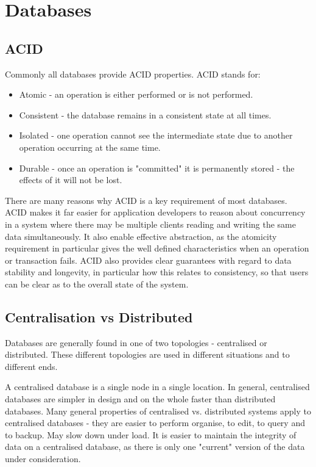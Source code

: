 \documentclass[12pt,twoside,notitlepage]{report}
\begin{document}
\section{Databases}

\subsection*{ACID}

Commonly all databases provide ACID properties. ACID stands for:

\begin{itemize}
\item Atomic - an operation is either performed or is not performed.
\item Consistent - the database remains in a consistent state at all times.
\item Isolated - one operation cannot see the intermediate state due to another operation occurring
	at the same time.
\item Durable - once an operation is "committed" it is permanently stored - the effects of it will
	not be lost.
\end{itemize}

There are many reasons why ACID is a key requirement of most databases. ACID makes it far easier
for application developers to reason about concurrency in a system where there may be multiple
clients reading and writing the same data simultaneously. It also enable effective abstraction, as
the atomicity requirement in particular gives the well defined characteristics when an operation
or transaction fails. ACID also provides clear guarantees with regard to data stability and
longevity, in particular how this relates to consistency, so that users can be clear as to the
overall state of the system.

\subsection*{Centralisation vs Distributed}

Databases are generally found in one of two topologies - centralised or distributed. These
different topologies are used in different situations and to different ends.

A centralised database is a single node in a single location.
In general, centralised databases are simpler in design and on the whole faster than distributed
databases.
Many general properties of centralised vs. distributed systems apply to centralised databases -
they are easier to perform organise, to edit, to query and to backup. May slow down under load. It
is easier to maintain the integrity of data on a centralised database, as there is only one
"current" version of the data under consideration.
\end{document}
